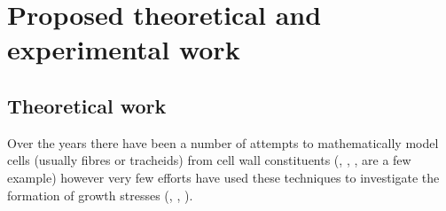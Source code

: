 \chapter{Proposed theoretical and experimental work}
\section{Theoretical work}
Over the years there have been a number of attempts to mathematically model
cells (usually fibres or tracheids) from cell wall constituents (\cite{mark1967cell}, \cite{Astley_1998}, \cite{Yamamoto_2002}, \cite{Kojima_2004} are a few example) however very few efforts have used these
techniques to investigate the formation of growth stresses (\cite{Archer_1987},
\cite{Yamamoto_1998}, \cite{Guitard_1999}).